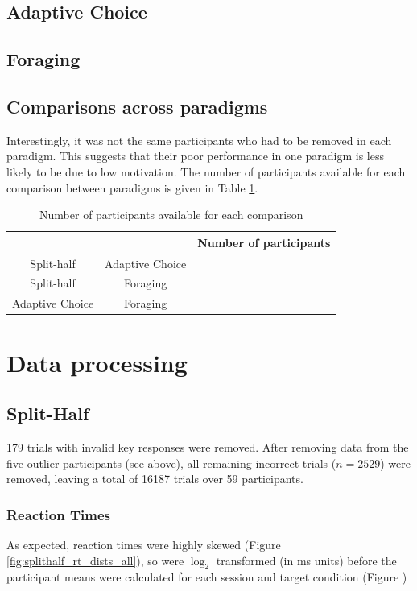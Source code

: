 \documentclass[a4paper, oneside, 11pt, onecolumn]{article}
\begin{document}
\subsection{Adaptive Choice}

\subsection{Foraging}

\subsection{Comparisons across paradigms}

Interestingly, it was not the same participants who had to be removed in each paradigm. This suggests that their poor performance in one paradigm is less likely to be due to low motivation. The number of participants available for each comparison between paradigms is given in Table \ref{tab:num_per_paradigm}.

\begin{table}
\centering
\small
\begin{tabular}{cc|c}
 			&					& Number of participants\\
\hline
Split-half 	& Adaptive Choice 	& \\
Split-half 	& Foraging 			& \\
Adaptive Choice & Foraging 		& \\
\end{tabular}
\caption{Number of participants available for each comparison}
\label{tab:num_per_paradigm}
\end{table}

\section{Data processing}

\subsection{Split-Half}

179 trials with invalid key responses were removed. After removing data from the five outlier participants (see above), all remaining incorrect trials ($n=2529$) were removed, leaving a total of 16187 trials over 59 participants.

\subsubsection{Reaction Times}
As expected, reaction times were highly skewed (Figure \ref{fig:splithalf_rt_dists_all}), so were $\log_2$ transformed (in ms units) before the participant means were calculated for each session and target condition (Figure )
\end{document}
